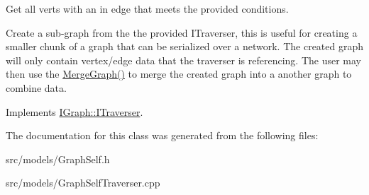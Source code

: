 Get all verts with an in edge that meets the provided conditions. 

Create a sub-\/graph from the the provided I\+Traverser, this is useful for creating a smaller chunk of a graph that can be serialized over a network. The created graph will only contain vertex/edge data that the traverser is referencing. The user may then use the \hyperlink{class_graph_self_a64103889965233bb574b55bf2b7b1188}{Merge\+Graph()} to merge the created graph into a another graph to combine data. 

Implements \hyperlink{class_i_graph_1_1_i_traverser_ac6ce6b5258a3ef06297b5b91b87bbf00}{I\+Graph\+::\+I\+Traverser}.



The documentation for this class was generated from the following files\+:\begin{DoxyCompactItemize}
\item 
src/models/Graph\+Self.\+h\item 
src/models/Graph\+Self\+Traverser.\+cpp\end{DoxyCompactItemize}
